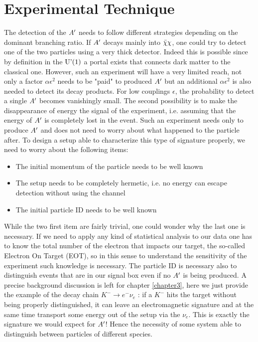 \section{Experimental Technique}
\label{ch2:sec:experimental-technique}

The detection of the $A'$ needs to follow different strategies depending on the dominant branching ratio. If $A'$ decays mainly into $\bar{\chi} \chi$, one could try to detect one of the two particles using a very thick detector. Indeed this is possible since by definition in the $\textrm{U'(1)}$ a portal exists that connects dark matter to the classical one. However, such an experiment will have a very limited reach, not only a factor $\alpha \epsilon^2$ needs to be "paid" to produced $A'$ but an additional $\alpha \epsilon^2$ is also needed to detect its decay products. For low couplings $\epsilon$, the probability to detect a single $A'$ becomes vanishingly small. The second possibility is to make the disappearance of energy the signal of the experiment, i.e. assuming that the energy of $A'$ is completely lost in the event. Such an experiment needs only to produce $A'$ and does not need to worry about what happened to the particle after. To design a setup able to characterize this type of signature properly, we need to worry about the following items:

\begin{itemize}
\item The initial momentum of the particle needs to be well known
\item The setup needs to be completely hermetic, i.e. no energy can escape detection without using the channel 
\item The initial particle ID needs to be well known
\end{itemize}

While the two first item are fairly trivial, one could wonder why the last one is necessary. If we need to apply any kind of statistical analysis to our data one has to know the total number of the electron that impacts our target, the so-called Electron On Target (EOT), so in this sense to understand the sensitivity of the experiment such knowledge is necessary. The particle ID is necessary also to distinguish events that are in our signal box even if no $A'$ is being produced. A precise background discussion is left for chapter \ref{chapter3}, here we just provide the example of the decay chain $K^- \to e^- \nu_e$ \cite{review-particle-physics}: if a $K^-$ hits the target without being properly distinguished, it can leave an electromagnetic signature and at the same time transport some energy out of the setup via the $\nu_e$. This is exactly the signature we would expect for $A'$! Hence the necessity of some system able to distinguish between particles of different species.

